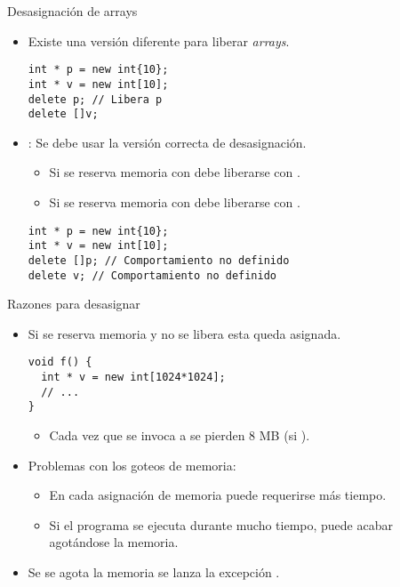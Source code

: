 \begin{frame}[fragile]{Desasignación de arrays}
\begin{itemize}
  \item Existe una versión diferente para liberar \emph{arrays}.
\begin{lstlisting}
int * p = new int{10};
int * v = new int[10];
delete p; // Libera p
delete []v;
\end{lstlisting}

  \vfill\pause
  \item {}: Se debe usar la versión correcta de desasignación.
    \begin{itemize}
      \item Si se reserva memoria con  debe liberarse con .
      \item Si se reserva memoria con  debe liberarse con .
    \end{itemize}
\begin{lstlisting}
int * p = new int{10};
int * v = new int[10];
delete []p; // Comportamiento no definido
delete v; // Comportamiento no definido
\end{lstlisting}
\end{itemize}
\end{frame}

\begin{frame}[fragile]{Razones para desasignar}
\begin{itemize}
  \item Si se reserva memoria y no se libera esta queda asignada.
\begin{lstlisting}
void f() {
  int * v = new int[1024*1024];
  // ...
}
\end{lstlisting}
    \begin{itemize}
      \item Cada vez que se invoca a  se pierden 8 MB (si ).
    \end{itemize}
  \item Problemas con los goteos de memoria:
    \begin{itemize}
      \item En cada asignación de memoria puede requerirse más tiempo.
      \item Si el programa se ejecuta durante mucho tiempo, puede acabar agotándose la memoria.
    \end{itemize}
  \item Se se agota la memoria se lanza la excepción .
\end{itemize}
\end{frame}


